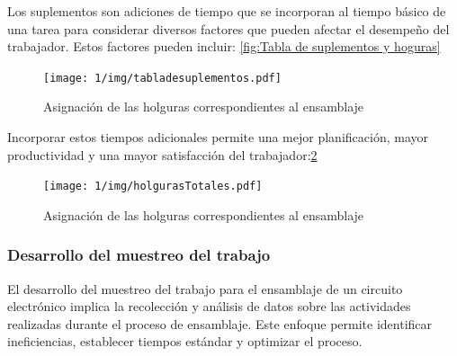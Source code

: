     Los suplementos son adiciones de tiempo que se incorporan al tiempo básico de una tarea para considerar diversos factores que pueden afectar el desempeño del trabajador. Estos factores pueden incluir:
    \ref{fig:Tabla de suplementos y hoguras}
     \begin{figure}[H]
            \centering
            \texttt{[image: 1/img/tabladesuplementos.pdf]}
            \caption{Asignación de las holguras correspondientes al ensamblaje}
            \label{fig:tabla de suplementos y hoguras}
        \end{figure}
    Incorporar estos tiempos adicionales permite una mejor planificación, mayor productividad y una mayor satisfacción del trabajador:\ref{fig:HolgurasTotales}
     \begin{figure}[H]
            \centering
            \texttt{[image: 1/img/holgurasTotales.pdf]}
            \caption{Asignación de las holguras correspondientes al ensamblaje}
            \label{fig:HolgurasTotales}
        \end{figure}
    
    \subsubsection{Desarrollo del muestreo del trabajo}
    El desarrollo del muestreo del trabajo para el ensamblaje de un circuito electrónico implica la recolección y análisis de datos sobre las actividades realizadas durante el proceso de ensamblaje. Este enfoque permite identificar ineficiencias, establecer tiempos estándar y optimizar el proceso.
    
